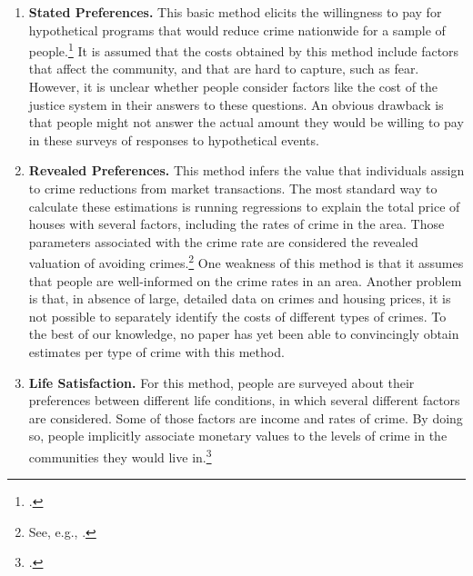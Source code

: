 \begin{enumerate}
\item \textbf{Stated Preferences.} This basic method elicits the willingness to pay for hypothetical programs that would reduce crime nationwide for a sample of people.\footnote{\citet{Cohen_Rust_etal_2004_Criminology}.} It is assumed that the costs obtained by this method include factors that affect the community, and that are hard to capture, such as fear. However, it is unclear whether people consider factors like the cost of the justice system in their answers to these questions. An obvious drawback is that people might not answer the actual amount they would be willing to pay in these surveys of responses to hypothetical events.
\item \textbf{Revealed Preferences.} This method infers the value that individuals assign to crime reductions from market transactions. The most standard way to calculate these estimations is running regressions to explain the total price of houses with several factors, including the rates of crime in the area. Those parameters associated with the crime rate are considered the revealed valuation of avoiding crimes.\footnote{See, e.g., \citet{Thaler_1978_Value-Crime-Control}.} One weakness of this method is that it assumes that people are well-informed on the crime rates in an area. Another problem is that, in absence of large, detailed data on crimes and housing prices, it is not possible to separately identify the costs of different types of crimes. To the best of our knowledge, no paper has yet been able to convincingly obtain estimates per type of crime with this method.
\item \textbf{Life Satisfaction.} For this method, people are surveyed about their preferences between different life conditions, in which several different factors are considered. Some of those factors are income and rates of crime. By doing so, people implicitly associate monetary values to the levels of crime in the communities they would live in.\footnote{\citet{ Moore_etal_2006_Cost-of-Fear,Moore_2006_Value-Reducing-Fear}.}
\end{enumerate}

